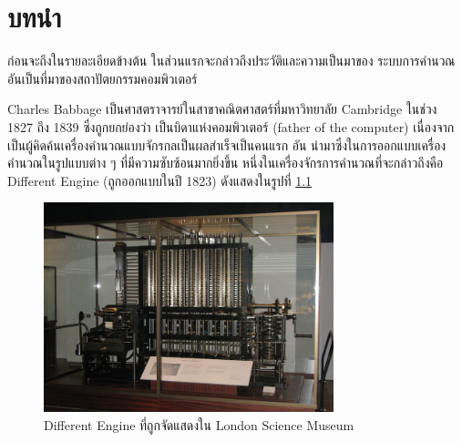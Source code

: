 \chapter{บทนำ}

\par{
ก่อนจะถึงในรายละเอียดข้างต้น 
ในส่วนแรกจะกล่าวถึงประวัติและความเป็นมาของ
ระบบการคำนวณอันเป็นที่มาของสถาปัตยกรรมคอมพิวเตอร์
}

\par{
Charles Babbage เป็นศาสตราจารย์ในสาขาคณิตศาสตร์ที่มหาวิทยาลัย 
Cambridge ในช่วง 1827 ถึง 1839 ซึ่งถูกยกย่องว่า
เป็นบิดาแห่งคอมพิวเตอร์ (father of the computer) 
\cite{halacy1970charles}
เนื่องจากเป็นผู้คิดค้นเครื่องคำนวณแบบจักรกลเป็นผลสำเร็จเป็นคนแรก อัน
นำมาซึ่งในการออกแบบเครื่องคำนวณในรูปแบบต่าง ๆ ที่มีความซับซ้อนมากยิ่งขึ้น 
หนึ่งในเครื่องจักรการคำนวณที่จะกล่าวถึงคือ Different Engine 
(ถูกออกแบบในปี 1823) ดังแสดงในรูปที่ 
\ref{fig_babbage_difference_engine}
}
%
%
\begin{figure}[h]
\centering
\includegraphics[width=0.75\textwidth]{fig/Babbage_Difference_Engine.png}
\caption{Different Engine ที่ถูกจัดแสดงใน London Science Museum}
\label{fig_babbage_difference_engine}
\end{figure}
%
%
